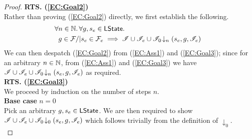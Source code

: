 \begin{lemma}
\begin{proof}
\noindent\textbf{RTS. (\ref{EC:Goal2})} \\
Rather than proving (\ref{EC:Goal2}) directly, we first establish the following.
%
\begin{align}
	& \forall n \in \mathbb{N}.\, \forall g, s_e \in \textsf{LState}.\, \nonumber\\
	& \;\; g \in \mathcal{F}_{} /| s_e \in \mathcal{F}_{e} \implies \mathscr{I} \cup \mathscr{I}_e \cup \mathscr{I}_0 \!\downarrow_{n} \left(s_e, g, \mathscr{I}_e\right) \label{EC:Goal3}
\end{align}
%
We can then despatch (\ref{EC:Goal2}) from (\ref{EC:Ass1}) and (\ref{EC:Goal3}); since for an arbitrary $n \in \mathbb{N}$, from (\ref{EC:Ass1}) and (\ref{EC:Goal3}) we have $\mathscr{I} \cup \mathscr{I}_e \cup \mathscr{I}_0 \!\downarrow_{n} \left(s_e, g, \mathscr{I}_e\right)$ as required. \\

\noindent\textbf{RTS. (\ref{EC:Goal3})} \\
We proceed by induction on the number of steps $n$.\\

\noindent\textbf{Base case }$n=0$\\
Pick an arbitrary $g, s_e \in \textsf{LState}$. We are then required to show	$\mathscr{I} \cup \mathscr{I}_e \cup \mathscr{I}_0 \!\downarrow_{0} \left(s_e, g, \mathscr{I}_e\right)$ which follows trivially from the definition of $\downarrow_0$.\\



\end{proof}
\end{lemma}
